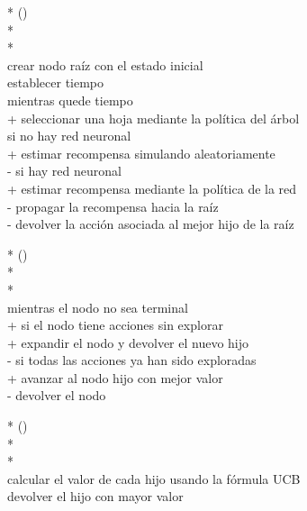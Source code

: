 \documentclass[conference,a4paper]{IEEEtran}
\begin{document}
\begin{figure}
  \begin{pseudo}*
    () \\*
     \\*
     \\
    \textnormal {crear nodo} raíz\textnormal{ con el estado inicial}\\
    \textnormal{establecer tiempo} \\ 
    \textnormal{mientras quede tiempo} \\+
      \textnormal{seleccionar una hoja mediante la} política \textnormal{del árbol} \\
      si no hay red neuronal \\+
        \textnormal{estimar recompensa simulando} aleatoriamente \\-
      si hay red neuronal \\+
        \textnormal{estimar recompensa mediante} la política de la red \\-
      propagar \textnormal{la recompensa hacia la raíz} \\-
    \textnormal{devolver la} acción \textnormal{asociada al mejor} hijo \textnormal{de la raíz}
  \end{pseudo}

  \begin{pseudo}*
    () \\*
     \\*
     \\
    \textnormal{mientras el} nodo no \textnormal{sea} terminal \\+
      \textnormal{si el nodo tiene acciones} sin explorar \\+
        expandir \textnormal{el nodo y devolver el nuevo hijo} \\-
      \textnormal{si todas las acciones ya han sido} exploradas \\+
        \textnormal{avanzar al nodo hijo con mejor valor} \\-
    \textnormal{devolver el nodo}
  \end{pseudo}

  \begin{pseudo}*
    () \\*
     \\*
     \\
     \textnormal{calcular el valor de cada hijo usando la fórmula} UCB \\
     \textnormal{devolver el hijo con mayor valor}
  \end{pseudo}


\end{figure}
\end{document}
